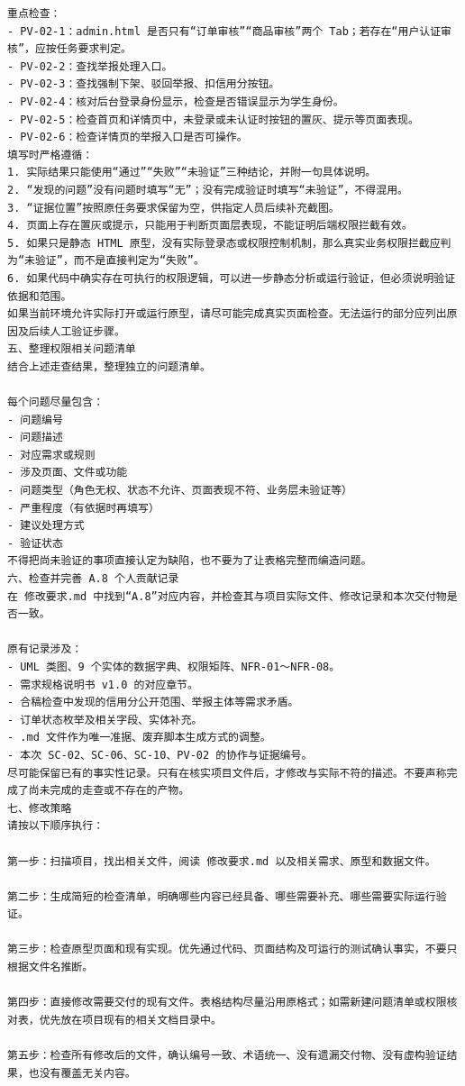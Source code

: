 \documentclass[heading=true,UTF8,a4paper,zihao=-4]{ctexart}
\begin{document}
\begin{QABox}
\begin{lstlisting}
重点检查：
- PV-02-1：admin.html 是否只有“订单审核”“商品审核”两个 Tab；若存在“用户认证审核”，应按任务要求判定。
- PV-02-2：查找举报处理入口。
- PV-02-3：查找强制下架、驳回举报、扣信用分按钮。
- PV-02-4：核对后台登录身份显示，检查是否错误显示为学生身份。
- PV-02-5：检查首页和详情页中，未登录或未认证时按钮的置灰、提示等页面表现。
- PV-02-6：检查详情页的举报入口是否可操作。
填写时严格遵循：
1. 实际结果只能使用“通过”“失败”“未验证”三种结论，并附一句具体说明。
2. “发现的问题”没有问题时填写“无”；没有完成验证时填写“未验证”，不得混用。
3. “证据位置”按照原任务要求保留为空，供指定人员后续补充截图。
4. 页面上存在置灰或提示，只能用于判断页面层表现，不能证明后端权限拦截有效。
5. 如果只是静态 HTML 原型，没有实际登录态或权限控制机制，那么真实业务权限拦截应判为“未验证”，而不是直接判定为“失败”。
6. 如果代码中确实存在可执行的权限逻辑，可以进一步静态分析或运行验证，但必须说明验证依据和范围。
如果当前环境允许实际打开或运行原型，请尽可能完成真实页面检查。无法运行的部分应列出原因及后续人工验证步骤。
五、整理权限相关问题清单
结合上述走查结果，整理独立的问题清单。

每个问题尽量包含：
- 问题编号
- 问题描述
- 对应需求或规则
- 涉及页面、文件或功能
- 问题类型（角色无权、状态不允许、页面表现不符、业务层未验证等）
- 严重程度（有依据时再填写）
- 建议处理方式
- 验证状态
不得把尚未验证的事项直接认定为缺陷，也不要为了让表格完整而编造问题。
六、检查并完善 A.8 个人贡献记录
在 修改要求.md 中找到“A.8”对应内容，并检查其与项目实际文件、修改记录和本次交付物是否一致。

原有记录涉及：
- UML 类图、9 个实体的数据字典、权限矩阵、NFR-01～NFR-08。
- 需求规格说明书 v1.0 的对应章节。
- 合稿检查中发现的信用分公开范围、举报主体等需求矛盾。
- 订单状态枚举及相关字段、实体补充。
- .md 文件作为唯一准据、废弃脚本生成方式的调整。
- 本次 SC-02、SC-06、SC-10、PV-02 的协作与证据编号。
尽可能保留已有的事实性记录。只有在核实项目文件后，才修改与实际不符的描述。不要声称完成了尚未完成的走查或不存在的产物。
七、修改策略
请按以下顺序执行：

第一步：扫描项目，找出相关文件，阅读 修改要求.md 以及相关需求、原型和数据文件。

第二步：生成简短的检查清单，明确哪些内容已经具备、哪些需要补充、哪些需要实际运行验证。

第三步：检查原型页面和现有实现。优先通过代码、页面结构及可运行的测试确认事实，不要只根据文件名推断。

第四步：直接修改需要交付的现有文件。表格结构尽量沿用原格式；如需新建问题清单或权限核对表，优先放在项目现有的相关文档目录中。

第五步：检查所有修改后的文件，确认编号一致、术语统一、没有遗漏交付物、没有虚构验证结果，也没有覆盖无关内容。


\end{lstlisting}
\end{QABox}
\end{document}
